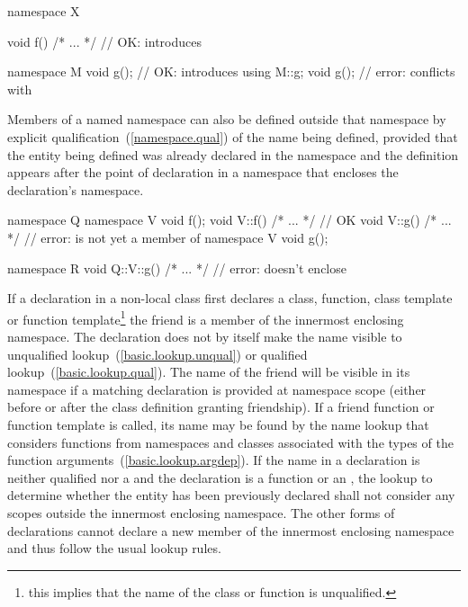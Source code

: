 \begin{codeblock}
namespace X {
  void f() { /* ... */ }  // OK: introduces 

  namespace M {
    void g();             // OK: introduces 
  }
  using M::g;
  void g();               // error: conflicts with 
}
\end{codeblock}
\exitexample

\pnum
Members of a named namespace can also be
defined outside that namespace by explicit
qualification~(\ref{namespace.qual}) of the name being defined, provided
that the entity being defined was already declared in the namespace and
the definition appears after the point of declaration in a namespace
that encloses the declaration's namespace.
\enterexample

\begin{codeblock}
namespace Q {
  namespace V {
    void f();
  }
  void V::f() { /* ... */ }     // OK
  void V::g() { /* ... */ }     // error:  is not yet a member of 
  namespace V {
    void g();
  }
}

namespace R {
  void Q::V::g() { /* ... */ }  // error:  doesn't enclose 
}
\end{codeblock}
\exitexample

\pnum
If a  declaration in a non-local class first declares a
class, function, class template or function template\footnote{this implies that the name of the class or function is unqualified.}
the friend is a member of the innermost enclosing
namespace. The  declaration does not by itself make the name
visible to unqualified lookup~(\ref{basic.lookup.unqual}) or qualified
lookup~(\ref{basic.lookup.qual}). \enternote The name of the friend will be
visible in its namespace if a matching declaration is provided at namespace
scope (either before or after the class definition granting friendship).
\exitnote If a friend
function or function template is called, its name may be found by the
name lookup that considers functions from namespaces and classes
associated with the types of the function
arguments~(\ref{basic.lookup.argdep}). If the
name in a  declaration is neither qualified nor a
 and the declaration is a function or an
, the lookup to determine whether
the entity has been previously declared shall not consider any scopes
outside the innermost enclosing namespace. \enternote The other forms of
 declarations cannot declare a new member of the innermost
enclosing namespace and thus follow the usual lookup rules.
\exitnote
\enterexample

